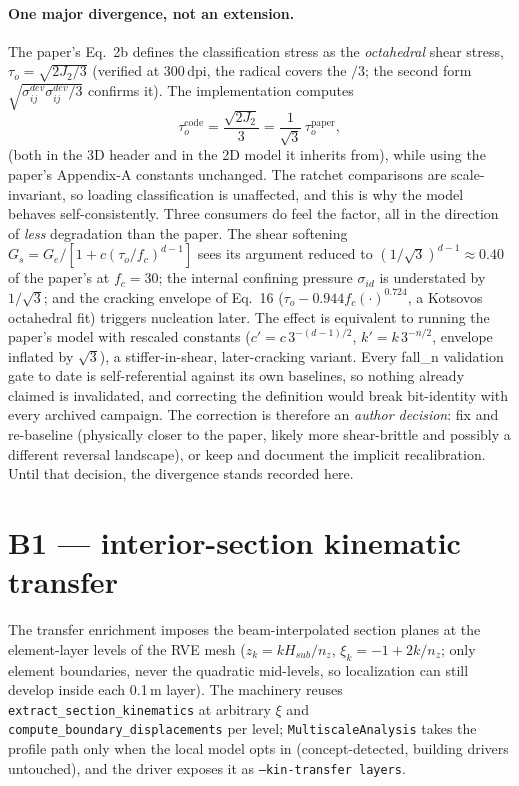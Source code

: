 \paragraph{One major divergence, not an extension.} The paper's Eq.~2b
defines the classification stress as the \emph{octahedral} shear
stress, $\tau_o = \sqrt{2J_2/3}$ (verified at 300\,dpi, the radical
covers the $/3$; the second form
$\sqrt{\sigma^{dev}_{ij}\sigma^{dev}_{ij}/3}$ confirms it). The
implementation computes
%
\[
  \tau_o^{\text{code}} = \frac{\sqrt{2J_2}}{3}
  = \frac{1}{\sqrt 3}\,\tau_o^{\text{paper}},
\]
%
(both in the 3D header and in the 2D model it inherits from), while
using the paper's Appendix-A constants unchanged. The ratchet
comparisons are scale-invariant, so loading classification is
unaffected, and this is why the model behaves self-consistently. Three
consumers do feel the factor, all in the direction of \emph{less}
degradation than the paper. The shear softening
$G_s = G_e/[1+c(\tau_o/f_c)^{d-1}]$ sees its argument reduced to
$(1/\sqrt3)^{d-1} \approx 0.40$ of the paper's at $f_c=30$; the
internal confining pressure $\sigma_{id}$ is understated by
$1/\sqrt3$; and the cracking envelope of Eq.~16
($\tau_o - 0.944 f_c(\cdot)^{0.724}$, a Kotsovos octahedral fit)
triggers nucleation later. The effect is equivalent to running the
paper's model with rescaled constants
($c' = c\,3^{-(d-1)/2}$, $k' = k\,3^{-n/2}$, envelope inflated by
$\sqrt3$), a stiffer-in-shear, later-cracking variant. Every fall\_n
validation gate to date is self-referential against its own baselines,
so nothing already claimed is invalidated, and correcting the
definition would break bit-identity with every archived campaign.
The correction is therefore an \emph{author decision}: fix and
re-baseline (physically closer to the paper, likely more shear-brittle
and possibly a different reversal landscape), or keep and document the
implicit recalibration. Until that decision, the divergence stands
recorded here.

\section{B1 --- interior-section kinematic transfer}
\label{sec:kb-b1}

The transfer enrichment imposes the beam-interpolated section planes at
the element-layer levels of the RVE mesh ($z_k = k H_{sub}/n_z$,
$\xi_k = -1 + 2k/n_z$; only element boundaries, never the quadratic
mid-levels, so localization can still develop inside each 0.1\,m
layer). The machinery reuses \texttt{extract\_section\_kinematics} at
arbitrary $\xi$ and \texttt{compute\_boundary\_displacements} per
level; \texttt{MultiscaleAnalysis} takes the profile path only when
the local model opts in (concept-detected, building drivers
untouched), and the driver exposes it as
\texttt{--kin-transfer layers}.

